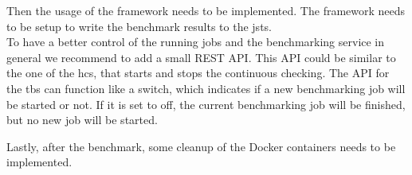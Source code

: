 Then the usage of the \iguana{} framework needs to be implemented.
The framework needs to be setup to write the benchmark results to the \acl{jsts}.
\\

To have a better control of the running jobs and the benchmarking service in general we recommend to add a small REST API.
This API could be similar to the one of the \ac{hcs}, that starts and stops the continuous checking.
The API for the \ac{tbs} can function like a switch, which indicates if a new benchmarking job will be started or not.
If it is set to off, the current benchmarking job will be finished, but no new job will be started.

Lastly, after the benchmark, some cleanup of the Docker containers needs to be implemented.



